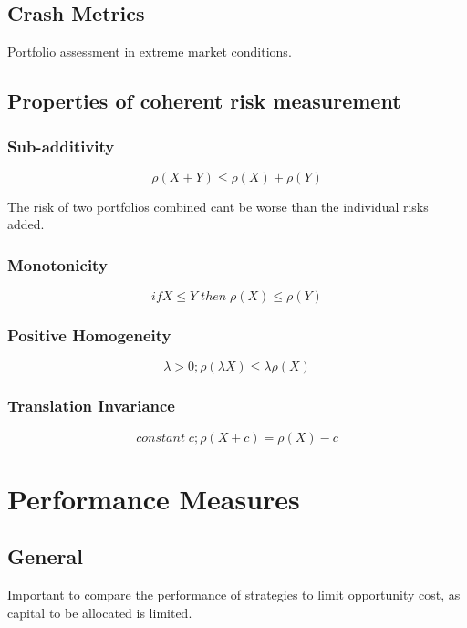 \documentclass[11pt]{scrartcl} %
\begin{document}
\subsection{Crash Metrics}

Portfolio assessment in extreme market conditions.

\subsection{Properties of coherent risk measurement}

\subsubsection{Sub-additivity}

\[ \rho (X+Y) \leq \rho (X) + \rho (Y) \]

The risk of two portfolios combined cant be worse than the individual risks added.

\subsubsection{Monotonicity}

\[ if X\leq Y \; then \; \rho (X) \leq \rho(Y) \]

\subsubsection{Positive Homogeneity}

\[ \lambda >0 ; \rho(\lambda X) \leq \lambda \rho (X) \]

\subsubsection{Translation Invariance}

\[ constant\; c; \rho (X+c) = \rho (X) -c \]

\section{Performance Measures}

\subsection{General}

Important to compare the performance of strategies to limit opportunity cost, as capital to be allocated is
limited.\\
\end{document}
